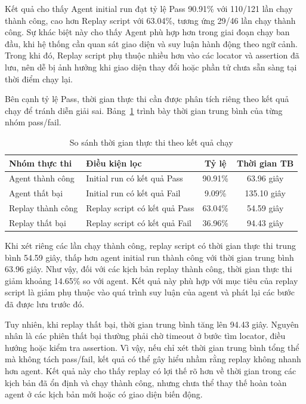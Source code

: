 Kết quả cho thấy Agent initial run đạt tỷ lệ Pass 90.91\% với 110/121 lần chạy thành công, cao hơn Replay script với 63.04\%, tương ứng 29/46 lần chạy thành công. Sự khác biệt này cho thấy Agent phù hợp hơn trong giai đoạn chạy ban đầu, khi hệ thống cần quan sát giao diện và suy luận hành động theo ngữ cảnh. Trong khi đó, Replay script phụ thuộc nhiều hơn vào các locator và assertion đã lưu, nên dễ bị ảnh hưởng khi giao diện thay đổi hoặc phần tử chưa sẵn sàng tại thời điểm chạy lại.

Bên cạnh tỷ lệ Pass, thời gian thực thi cần được phân tích riêng theo kết quả chạy để tránh diễn giải sai. Bảng~\ref{tab:chapter6_agent_replay_time_by_result} trình bày thời gian trung bình của từng nhóm pass/fail.

\begin{table}[H]
\centering
\caption{So sánh thời gian thực thi theo kết quả chạy}
\label{tab:chapter6_agent_replay_time_by_result}
\renewcommand{\arraystretch}{1.2}
\begin{tabular}{|p{4.2cm}|p{4.2cm}|c|c|}
\hline
\textbf{Nhóm thực thi} & \textbf{Điều kiện lọc} & \textbf{Tỷ lệ} & \textbf{Thời gian TB} \\
\hline
Agent thành công & Initial run có kết quả Pass & 90.91\% & 63.96 giây \\
\hline
Agent thất bại & Initial run có kết quả Fail & 9.09\% & 135.10 giây \\
\hline
Replay thành công & Replay script có kết quả Pass & 63.04\% & 54.59 giây \\
\hline
Replay thất bại & Replay script có kết quả Fail & 36.96\% & 94.43 giây \\
\hline
\end{tabular}
\end{table}

Khi xét riêng các lần chạy thành công, replay script có thời gian thực thi trung bình 54.59 giây, thấp hơn agent initial run thành công với thời gian trung bình 63.96 giây. Như vậy, đối với các kịch bản replay thành công, thời gian thực thi giảm khoảng 14.65\% so với agent. Kết quả này phù hợp với mục tiêu của replay script là giảm phụ thuộc vào quá trình suy luận của agent và phát lại các bước đã được lưu trước đó.

Tuy nhiên, khi replay thất bại, thời gian trung bình tăng lên 94.43 giây. Nguyên nhân là các phiên thất bại thường phải chờ timeout ở bước tìm locator, điều hướng hoặc kiểm tra assertion. Vì vậy, nếu chỉ xét thời gian trung bình tổng thể mà không tách pass/fail, kết quả có thể gây hiểu nhầm rằng replay không nhanh hơn agent. Kết quả này cho thấy replay có lợi thế rõ hơn về thời gian trong các kịch bản đã ổn định và chạy thành công, nhưng chưa thể thay thế hoàn toàn agent ở các kịch bản mới hoặc có giao diện biến động.

